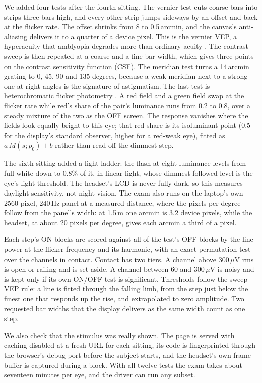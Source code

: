 \documentclass[conference]{IEEEtran}
\begin{document}
We added four tests after the fourth sitting. The vernier test cuts coarse bars into strips three bars high, and every other strip jumps sideways by an offset and back at the flicker rate. The offset shrinks from 8 to 0.5\,arcmin, and the canvas's anti-aliasing delivers it to a quarter of a device pixel. This is the vernier VEP, a hyperacuity that amblyopia degrades more than ordinary acuity \cite{norcia1999vernier}. The contrast sweep is then repeated at a coarse and a fine bar width, which gives three points on the contrast sensitivity function (CSF). The meridian test turns a 14\,arcmin grating to 0, 45, 90 and 135 degrees, because a weak meridian next to a strong one at right angles is the signature of astigmatism. The last test is heterochromatic flicker photometry \cite{wagner1972photometry}. A red field and a green field swap at the flicker rate while red's share of the pair's luminance runs from 0.2 to 0.8, over a steady mixture of the two as the OFF screen. The response vanishes where the fields look equally bright to this eye; that red share is its isoluminant point (0.5 for the display's standard observer, higher for a red-weak eye), fitted as $a\,M(s;p_0)+b$ rather than read off the dimmest step.

The sixth sitting added a light ladder: the flash at eight luminance levels from full white down to 0.8\% of it, in linear light, whose dimmest followed level is the eye's light threshold. The headset's LCD is never fully dark, so this measures daylight sensitivity, not night vision. The exam also runs on the laptop's own 2560-pixel, 240\,Hz panel at a measured distance, where the pixels per degree follow from the panel's width: at 1.5\,m one arcmin is 3.2 device pixels, while the headset, at about 20 pixels per degree, gives each arcmin a third of a pixel.

Each step's ON blocks are scored against all of the test's OFF blocks by the line power at the flicker frequency and its harmonic, with an exact permutation test over the channels in contact. Contact has two tiers. A channel above 300\,$\mu$V rms is open or railing and is set aside. A channel between 60 and 300\,$\mu$V is noisy and is kept only if its own ON/OFF test is significant. Thresholds follow the sweep-VEP rule: a line is fitted through the falling limb, from the step just below the finest one that responds up the rise, and extrapolated to zero amplitude. Two requested bar widths that the display delivers as the same width count as one step.

We also check that the stimulus was really shown. The page is served with caching disabled at a fresh URL for each sitting, its code is fingerprinted through the browser's debug port before the subject starts, and the headset's own frame buffer is captured during a block. With all twelve tests the exam takes about seventeen minutes per eye, and the driver can run any subset.
\end{document}
